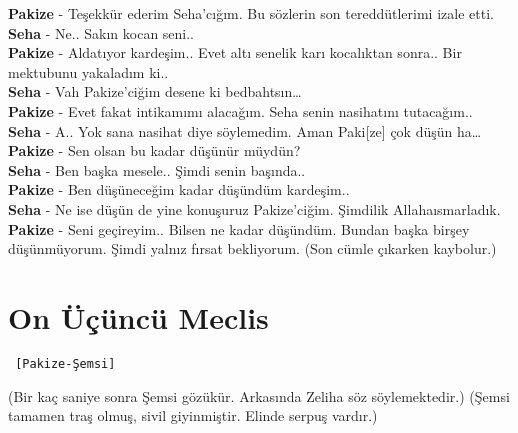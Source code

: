 \documentclass[]{book}
\begin{document}
\textbf{Pakize} - Teşekkür ederim Seha'cığım. Bu sözlerin son tereddütlerimi izale etti.\\
\textbf{Seha} - Ne.. Sakın kocan seni..\\
\textbf{Pakize} - Aldatıyor kardeşim.. Evet altı senelik karı kocalıktan sonra.. Bir mektubunu yakaladım ki..\\
\textbf{Seha} - Vah Pakize'ciğim desene ki bedbahtsın\ldots{}\\
\textbf{Pakize} - Evet fakat intikamımı alacağım. Seha senin nasihatını tutacağım..\\
\textbf{Seha} - A.. Yok sana nasihat diye söylemedim. Aman Paki{[}ze{]} çok düşün ha\ldots{}\\
\textbf{Pakize} - Sen olsan bu kadar düşünür müydün?\\
\textbf{Seha} - Ben başka mesele.. Şimdi senin başında..\\
\textbf{Pakize} - Ben düşüneceğim kadar düşündüm kardeşim..\\
\textbf{Seha} - Ne ise düşün de yine konuşuruz Pakize'ciğim. Şimdilik Allahaısmarladık.\\
\textbf{Pakize} - Seni geçireyim.. Bilsen ne kadar düşündüm. Bundan başka birşey düşünmüyorum. Şimdi yalnız fırsat bekliyorum. (Son cümle çıkarken kaybolur.)\\

\hypertarget{on-ucuncu-meclis}{%
\section{On Üçüncü Meclis}\label{on-ucuncu-meclis}}

\begin{verbatim}
 [Pakize-Şemsi]
\end{verbatim}

(Bir kaç saniye sonra Şemsi gözükür. Arkasında Zeliha söz söylemektedir.) (Şemsi tamamen traş olmuş, sivil giyinmiştir. Elinde serpuş vardır.)
\end{document}
